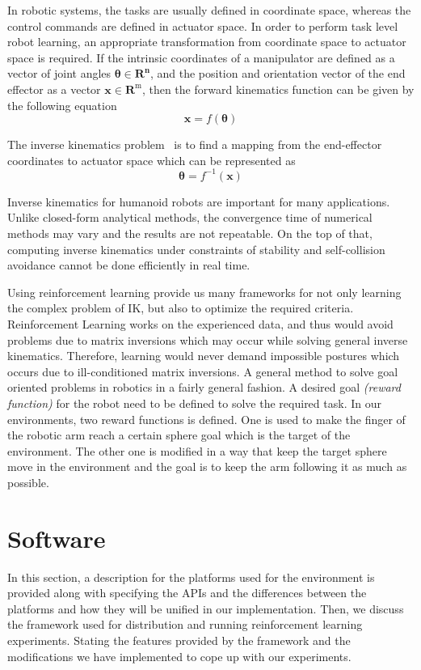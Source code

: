 In robotic systems, the tasks are usually defined in coordinate space, whereas the control commands are defined in actuator space. In order to perform task level robot learning, an appropriate transformation from coordinate space to actuator space is required. If the intrinsic coordinates of a manipulator are defined as a vector of joint angles \(\boldsymbol{\theta} \in \mathbf{R}^{\mathbf{n}}\), and the position and orientation vector of the end effector as a vector \(\mathbf{x} \in \mathbf{R}^{\mathrm{m}}\), then the forward kinematics function can be given by the following equation 
\begin{equation}
	\mathbf{x}=f(\boldsymbol{\theta})
\end{equation}

The inverse kinematics problem~\parencite{colome2011smooth, chua2013robust} is to find a mapping from the end-effector coordinates to actuator space which can be represented as
\begin{equation}
	\boldsymbol{\theta}=f^{-1}(\mathbf{x})
\end{equation}

Inverse kinematics for humanoid robots are important for many applications. Unlike closed-form analytical methods, the convergence time of numerical methods may vary and the results are not repeatable. On the top of that, computing inverse kinematics under constraints of stability and self-collision avoidance cannot be done efficiently in real time.

Using reinforcement learning provide us many frameworks for not only learning the complex problem of IK, but also to optimize the required criteria. Reinforcement Learning works on the experienced data, and thus would avoid problems due to matrix inversions which may occur while solving general inverse kinematics. Therefore, learning would never demand impossible postures which occurs due to ill-conditioned matrix inversions. A general method to solve goal oriented problems in robotics in a fairly general fashion. A desired goal \textit{(reward function)} for the robot need to be defined to solve the required task. In our environments, two reward functions is defined. One is used to make the finger of the robotic arm reach a certain sphere goal which is the target of the environment. The other one is modified in a way that keep the target sphere move in the environment and the goal is to keep the arm following it as much as possible. 


\section{Software}
In this section, a description for the platforms used for the environment is provided along with specifying the APIs and the differences between the platforms and how they will be unified in our implementation. Then, we discuss the framework used for distribution and running reinforcement learning experiments. Stating the features provided by the framework and the modifications we have implemented to cope up with our experiments. 

